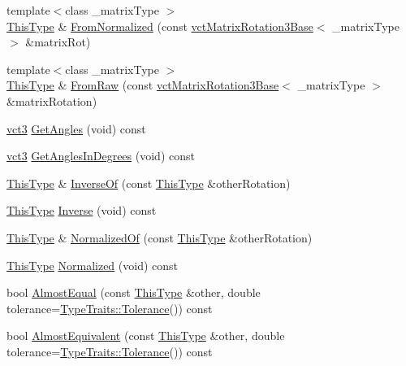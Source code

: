 \begin{DoxyCompactItemize}
\item 
{\footnotesize template$<$class \-\_\-matrix\-Type $>$ }\\\hyperlink{classvct_euler_rotation3}{This\-Type} \& \hyperlink{classvct_euler_rotation3_a0700edaa6d3420093a13ec7123155aa2}{From\-Normalized} (const \hyperlink{classvct_matrix_rotation3_base}{vct\-Matrix\-Rotation3\-Base}$<$ \-\_\-matrix\-Type $>$ \&matrix\-Rot)
\item 
{\footnotesize template$<$class \-\_\-matrix\-Type $>$ }\\\hyperlink{classvct_euler_rotation3}{This\-Type} \& \hyperlink{classvct_euler_rotation3_aee35d05518d231f713cb60cc8de976f1}{From\-Raw} (const \hyperlink{classvct_matrix_rotation3_base}{vct\-Matrix\-Rotation3\-Base}$<$ \-\_\-matrix\-Type $>$ \&matrix\-Rotation)
\item 
\hyperlink{vct_fixed_size_vector_types_8h_a3af82acdbf4eeb73c551909240b106ea}{vct3} \hyperlink{classvct_euler_rotation3_a8b797f4504dd45532ad4f41c1cb989f1}{Get\-Angles} (void) const 
\item 
\hyperlink{vct_fixed_size_vector_types_8h_a3af82acdbf4eeb73c551909240b106ea}{vct3} \hyperlink{classvct_euler_rotation3_acd7395ab5a8cde6afe4dfcc232a8fbe3}{Get\-Angles\-In\-Degrees} (void) const 
\item 
\hyperlink{classvct_euler_rotation3}{This\-Type} \& \hyperlink{classvct_euler_rotation3_a5877dde2e9ef151fcadce173cd6ae9fb}{Inverse\-Of} (const \hyperlink{classvct_euler_rotation3}{This\-Type} \&other\-Rotation)
\item 
\hyperlink{classvct_euler_rotation3}{This\-Type} \hyperlink{classvct_euler_rotation3_af93edc89a2acfc24d0c9f74ff366f8e5}{Inverse} (void) const 
\item 
\hyperlink{classvct_euler_rotation3}{This\-Type} \& \hyperlink{classvct_euler_rotation3_a716f3e35b256b78ab4339248833dce37}{Normalized\-Of} (const \hyperlink{classvct_euler_rotation3}{This\-Type} \&other\-Rotation)
\item 
\hyperlink{classvct_euler_rotation3}{This\-Type} \hyperlink{classvct_euler_rotation3_a4673862f5a07020edadedf0e054a0b8a}{Normalized} (void) const 
\item 
bool \hyperlink{classvct_euler_rotation3_a4525b17d3de059cca190420b9de4ad34}{Almost\-Equal} (const \hyperlink{classvct_euler_rotation3}{This\-Type} \&other, double tolerance=\hyperlink{classcmn_type_traits_adc129bf9867295b90d300768b780fa99}{Type\-Traits\-::\-Tolerance}()) const 
\item 
bool \hyperlink{classvct_euler_rotation3_aac1da2a6b1cec3f9032bae6886f6aeff}{Almost\-Equivalent} (const \hyperlink{classvct_euler_rotation3}{This\-Type} \&other, double tolerance=\hyperlink{classcmn_type_traits_adc129bf9867295b90d300768b780fa99}{Type\-Traits\-::\-Tolerance}()) const 

\end{DoxyCompactItemize}
